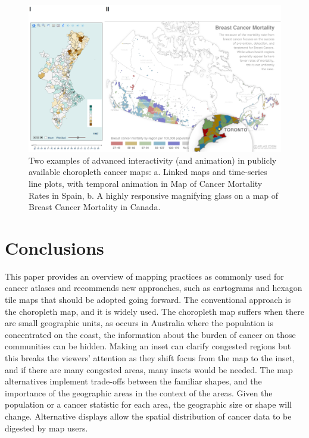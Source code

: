 \documentclass{monashthesis}
\begin{document}
\begin{figure}
\includegraphics[width=50in]{figures/02-literature/animating} \caption{Two examples of advanced interactivity (and animation) in publicly available choropleth cancer maps: a. Linked maps and time-series line plots, with temporal animation in Map of Cancer Mortality Rates in Spain, b. A highly responsive magnifying glass on a map of Breast Cancer Mortality in Canada.}\label{fig:animating}
\end{figure}

\hypertarget{conclusions}{%
\section{Conclusions}\label{conclusions}}

This paper provides an overview of mapping practices as commonly used for cancer atlases and recommends new approaches, such as cartograms and hexagon tile maps that should be adopted going forward. The conventional approach is the choropleth map, and it is widely used. The choropleth map suffers when there are small geographic units, as occurs in Australia where the population is concentrated on the coast, the information about the burden of cancer on those communities can be hidden. Making an inset can clarify congested regions but this breaks the viewers' attention as they shift focus from the map to the inset, and if there are many congested areas, many insets would be needed. The map alternatives implement trade-offs between the familiar shapes, and the importance of the geographic areas in the context of the areas. Given the population or a cancer statistic for each area, the geographic size or shape will change. Alternative displays allow the spatial distribution of cancer data to be digested by map users.
\end{document}

